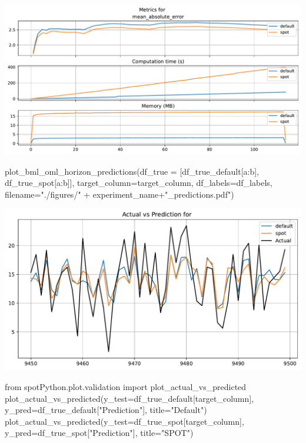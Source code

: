 \documentclass[
  letterpaper,
  DIV=11,
  numbers=noendperiod]{scrreprt}
\newenvironment{Shaded}{\begin{snugshade}}{\end{snugshade}}
\newcommand{\ImportTok}[1]{\textcolor[rgb]{0.00,0.46,0.62}{#1}}
\newcommand{\NormalTok}[1]{\textcolor[rgb]{0.00,0.23,0.31}{#1}}
\newcommand{\OperatorTok}[1]{\textcolor[rgb]{0.37,0.37,0.37}{#1}}
\newcommand{\StringTok}[1]{\textcolor[rgb]{0.13,0.47,0.30}{#1}}
\begin{document}
\includegraphics{025_spot_hpt_river_friedman_amfr_files/figure-pdf/cell-33-output-1.pdf}

\begin{Shaded}
\begin{Highlighting}[]
\NormalTok{plot\_bml\_oml\_horizon\_predictions(df\_true }\OperatorTok{=}\NormalTok{ [df\_true\_default[a:b], df\_true\_spot[a:b]], target\_column}\OperatorTok{=}\NormalTok{target\_column,  df\_labels}\OperatorTok{=}\NormalTok{df\_labels, filename}\OperatorTok{=}\StringTok{"./figures/"} \OperatorTok{+}\NormalTok{ experiment\_name}\OperatorTok{+}\StringTok{"\_predictions.pdf"}\NormalTok{)}
\end{Highlighting}
\end{Shaded}

\includegraphics{025_spot_hpt_river_friedman_amfr_files/figure-pdf/cell-34-output-1.pdf}

\begin{Shaded}
\begin{Highlighting}[]
\ImportTok{from}\NormalTok{ spotPython.plot.validation }\ImportTok{import}\NormalTok{ plot\_actual\_vs\_predicted}
\NormalTok{plot\_actual\_vs\_predicted(y\_test}\OperatorTok{=}\NormalTok{df\_true\_default[target\_column], y\_pred}\OperatorTok{=}\NormalTok{df\_true\_default[}\StringTok{"Prediction"}\NormalTok{], title}\OperatorTok{=}\StringTok{"Default"}\NormalTok{)}
\NormalTok{plot\_actual\_vs\_predicted(y\_test}\OperatorTok{=}\NormalTok{df\_true\_spot[target\_column], y\_pred}\OperatorTok{=}\NormalTok{df\_true\_spot[}\StringTok{"Prediction"}\NormalTok{], title}\OperatorTok{=}\StringTok{"SPOT"}\NormalTok{)}
\end{Highlighting}
\end{Shaded}
\end{document}
